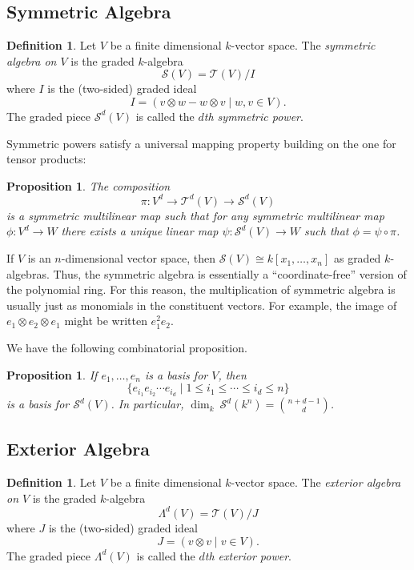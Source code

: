 \documentclass[12pt]{article}
\theoremstyle{plain}
\newtheorem{proposition}[theorem]{Proposition}
\theoremstyle{definition}
\newtheorem{definition}[theorem]{Definition}
\theoremstyle{remark}
\numberwithin{equation}{section}
\begin{document}
\subsection{Symmetric Algebra}

\begin{definition}
Let $V$ be a finite dimensional $k$-vector space.
The \emph{symmetric algebra on $V$} is the graded $k$-algebra
\[
\mathcal{S}(V) = \mathcal{T}(V)/I
\]
where $I$ is the (two-sided) graded ideal
\[
I = ( v \otimes w - w \otimes v \mid w,v \in V ).
\]
The graded piece $\mathcal{S}^d(V)$ is called the
\emph{$d$th symmetric power}.
\end{definition}

Symmetric powers satisfy a universal mapping property building on the
one for tensor products:

\begin{proposition}
The composition
\[
\pi : V^d \to \mathcal{T}^d(V) \to \mathcal{S}^d(V)
\]
is a symmetric multilinear map such that for any
symmetric multilinear map
$\phi : V^d \to W$ there exists a unique linear map
$\psi : \mathcal{S}^d(V) \to W$
such that
$\phi = \psi \circ \pi$.
\end{proposition}

If $V$ is an $n$-dimensional vector space, then
$\mathcal{S}(V) \cong k[x_1,\ldots,x_n]$ as graded $k$-algebras.
Thus, the symmetric algebra is essentially a ``coordinate-free'' version of
the polynomial ring.
For this reason, the multiplication of symmetric algebra is usually just
as monomials in the constituent vectors.
For example, the image of $e_1 \otimes e_2 \otimes e_1$ might be
written $e_1^2e_2$.

We have the following combinatorial proposition.

\begin{proposition}
If $e_1, \ldots, e_n$ is a basis for $V$, then
\[
\{
e_{i_1}e_{i_2} \cdots e_{i_d}
\mid
1 \le i_1 \le \cdots \le i_d \le n
\}
\]
is a basis for $\mathcal{S}^d(V)$.
In particular, $\dim_k\ \mathcal{S}^d(k^n)=\binom{n+d-1}{d}$.
\end{proposition}

\subsection{Exterior Algebra}

\begin{definition}
Let $V$ be a finite dimensional $k$-vector space.
The \emph{exterior algebra on $V$} is the graded $k$-algebra
\[
\Lambda^d(V) = \mathcal{T}(V)/J
\]
where $J$ is the (two-sided) graded ideal
\[
J = ( v \otimes v \mid v \in V ).
\]
The graded piece $\Lambda^d(V)$ is called the
\emph{$d$th exterior power}.
\end{definition}
\end{document}
